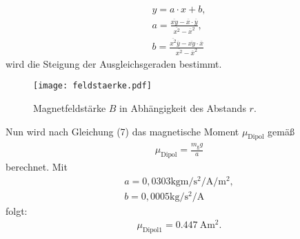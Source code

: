 \begin{align}
  y = a \cdot x + b, \\
  a = \frac{\overline{xy}-\overline{x}\cdot\overline{y}}{\overline{x^2}-\overline{x}^2}, \\
  b = \frac{\overline{x^2}\overline{y}-\overline{xy}\cdot\overline{x}}{\overline{x^2}-\overline{x}^2}
\end{align}
wird die Steigung der Ausgleichsgeraden bestimmt.

\begin{figure}
  \center
  \texttt{[image: feldstaerke.pdf]}
  \caption{Magnetfeldstärke $B$ in Abhängigkeit des Abstands $r$.}
  \label{fig:feldstaerke}
\end{figure}

\noindent Nun wird nach Gleichung (7) das magnetische Moment $\mu_\text{Dipol}$ gemäß
\begin{gather}
\mu_\text{Dipol} = \frac{m_\text{g}g}{a}
\end{gather}
berechnet.
Mit
\begin{align*}
a = 0,0303 \si{\kilo\gram\meter\per\second\squared\per\ampere\per\meter\squared}, \\
b = 0,0005 \si{\kilo\gram\per\second\squared\per\ampere}
\end{align*}
folgt:
\begin{gather*}
\mu_\text{Dipol1} = \SI{0.447}{\ampere\meter\squared}.
\end{gather*}

